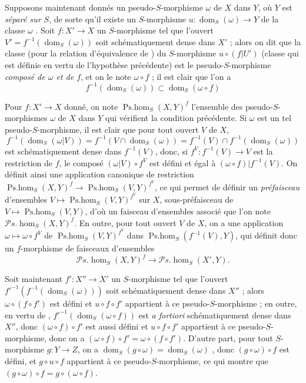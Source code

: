 \begin{env}[20.3.2]
\label{IV.20.3.2}
Supposons maintenant donnés un pseudo-$S$-morphisme $\omega$ de $X$ dans $Y$, où $Y$ est \emph{séparé sur $S$}, de sorte qu'il existe un $S$-morphisme $u:\operatorname{dom}_S(\omega)\to Y$ de la classe $\omega$ .
Soit $f:X'\to X$ un $S$-morphisme tel que l'ouvert $V'=f^{-1}(\operatorname{dom}_S(\omega))$ soit schématiquement dense dans $X'$ ; alors on dit que la classe (pour la relation d'équivalence de ) du $S$-morphisme $u\circ(f|U')$ (classe qui est définie en vertu de l'hypothèse précédente) est le pseudo-$S$-morphisme \emph{composé de $\omega$ et de $f$}, et on le note $\omega\circ f$ ; il est clair que l'on a
\[
\label{IV.20.3.2.1}
  f^{-1}(\operatorname{dom}_S(\omega))\subset\operatorname{dom}_S(\omega\circ f)
  \tag{20.3.2.1}
\]

Pour $f:X'\to X$ donné, on note $\operatorname{Ps.hom}_S(X,Y)^f$ l'ensemble des pseudo-$S$-morphismes $\omega$ de $X$ dans $Y$ qui vérifient la condition précédente.
Si $\omega$ est un tel pseudo-$S$-morphisme, il est clair que pour tout ouvert $V$ de $X$,
\[
  f^{-1}(\operatorname{dom}_S(\omega|V))=f^{-1}(V\cap\operatorname{dom}_S(\omega))=f^{-1}(V)\cap f^{-1}(\operatorname{dom}_S(\omega))
\]
est schématiquement dense dans $f^{-1}(V)$, donc, si $f^V:f^{-1}(V)\to V$ est la restriction de $f$, le composé $(\omega|V)\circ f^V$ est défini et égal à $(\omega\circ f)|f^{-1}(V)$.
On définit ainsi une
application canonique de restriction $\operatorname{Ps.hom}_S(X,Y)^f\to\operatorname{Ps.hom}_S(V,Y)^{f^V}$, ce qui permet de définir un \emph{préfaisceau} d'ensembles $V\mapsto\operatorname{Ps.hom}_S(V,Y)^{f^V}$ sur $X$, sous-préfaisceau de $V\mapsto\operatorname{Ps.hom}_S(V,Y)$, d'où un faisceau d'ensembles associé que l'on note $\mathscr{P}\!s.\!\operatorname{hom}_S(X,Y)^f$.
En outre, pour tout ouvert $V$ de $X$, on a une application $\omega\mapsto\omega\circ f^V$ de $\operatorname{Ps.hom}_S(V,Y)^{f^V}$ dans $\operatorname{Ps.hom}_S(f^{-1}(V),Y)$, qui définit donc un $f$-morphisme de faisceaux d'ensembles
\[
  \mathscr{P}\!s.\!\operatorname{hom}_S(X,Y)^f\to\mathscr{P}\!s.\!\operatorname{hom}_S(X',Y).
\]
\end{env}

\begin{env}[20.3.3]
\label{IV.20.3.3}
Soit maintenant $f':X''\to X'$ un $S$-morphisme tel que l'ouvert $f'^{-1}(f^{-1}(\operatorname{dom}_S(\omega)))$ soit schématiquement dense dans $X''$ ; alors $\omega\circ(f\circ f')$ est défini et $u\circ f\circ f'$ appartient à ce pseudo-$S$-morphisme ; en outre, en vertu de , $f'^{-1}(\operatorname{dom}_S(\omega\circ f))$ est \emph{a fortiori} schématiquement dense dans $X''$, donc $(\omega\circ f)\circ f'$ est aussi défini et $u\circ f\circ f'$ appartient à ce pseudo-$S$-morphisme, donc on a $(\omega\circ f)\circ f'=\omega\circ(f\circ f')$.
D'autre part, pour tout $S$-morphisme $g:Y\to Z$, on a $\operatorname{dom}_S(g\circ\omega)=\operatorname{dom}_S(\omega)$ , donc $(g\circ\omega)\circ f$ est défini, et $g\circ u\circ f$ appartient à ce pseudo-$S$-morphisme, ce qui montre que $(g\circ\omega)\circ f=g\circ(\omega\circ f)$.
\end{env}

